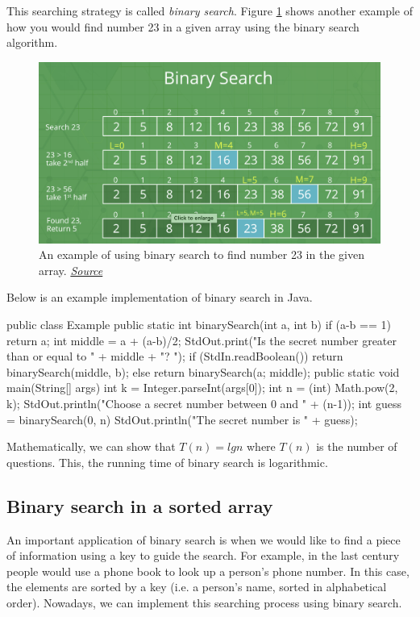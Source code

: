 This searching strategy is called \textit{binary search}. Figure \ref{fig:binary} shows another example of how you would find number 23 in a given array using the binary search algorithm.

\begin{figure}
    \centering
    \includegraphics[width=\textwidth]{images/binary.png}
    \caption{An example of using binary search to find number 23 in the given array. \href{https://www.geeksforgeeks.org/binary-search/}{\textit{Source}}}
    \label{fig:binary}
\end{figure}


Below is an example implementation of binary search in Java.

\begin{code}
public class Example
{
    public static int binarySearch(int a, int b)
	{
	if (a-b == 1) return a;
 	int middle = a + (a-b)/2;
	StdOut.print("Is the secret number greater than or equal to " + middle + "? ");
	if (StdIn.readBoolean())
		return binarySearch(middle, b);
	else
		return binarySearch(a; middle);
	}
	public static void main(String[] args)
{
int k = Integer.parseInt(args[0]);
int n = (int) Math.pow(2, k);
StdOut.println("Choose a secret number between 0 and " + (n-1));
int guess = binarySearch(0, n)
StdOut.println("The secret number is " + guess);
}
}
\end{code}
 
 
 Mathematically, we can show that $T(n) = lg n$ where $T(n)$ is the number of questions. This, the running time of binary search is logarithmic.

\subsection{Binary search in a sorted array}
An important application of binary search is when we would like to find a piece of information using a key to guide the search. For example, in the last century people would use a phone book to look up a person’s phone number. In this case, the elements are sorted by a key (i.e. a person’s name, sorted in alphabetical order). Nowadays, we can implement this searching process using binary search.



